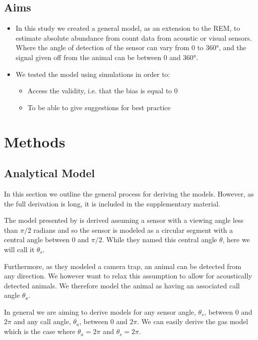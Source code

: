 \documentclass[a4paper,10pt,reqno,oneside]{amsart}
\begin{document}
\subsection{Aims}

\begin{itemize}
\item  In this study we created a general model, as an extension to the REM, to estimate absolute abundance from count data from acoustic or visual sensors. Where the angle of detection of the sensor can vary from 0 to 360°, and the signal given off from the animal can be between 0 and 360°.
\item  We tested the model using simulations in order to:
\begin{itemize}
\item Access the validity, i.e. that the bias is equal to 0
\item  To be able to give suggestions for best practice
\end{itemize}
\end{itemize}


\section{Methods}

\subsection{Analytical Model}

In this section we outline the general process for deriving the models. However, as the full derivation is long, it is included in the supplementary material.

The model presented by \cite{Rowcliffe2008estimating} is derived assuming a sensor with a viewing angle less than 
$\pi/2$ radians and so the sensor is modeled as a circular segment with a central angle between 0 and  $\pi/2$. While they named this central angle $\theta$, here we will call it $\theta_s$.

Furthermore, as they modeled a camera trap, an animal can be detected from any direction. We however want to relax this assumption to allow for acoustically detected animals. We therefore model the animal as having an associated call angle $\theta_a$.

In general we are aiming to derive models for any sensor angle, $ \theta_s$, between 0 and $2\pi$ and any call angle, $ \theta_a$, between 0 and $2\pi$. We can easily derive the gas model which is the case where $ \theta_a =  2\pi$ and $ \theta_s =  2\pi$.
\end{document}
